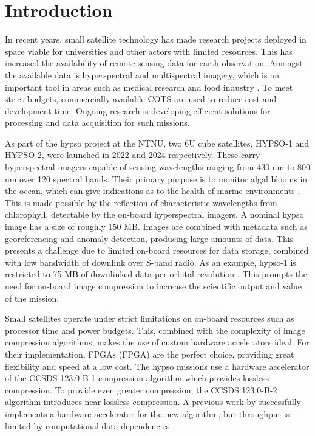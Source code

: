 \chapter{Introduction}

In recent years, small satellite technology has made research projects deployed in space viable for universities and other actors with limited resources. This has increased the availability of remote sensing data for earth observation. Amongst the available data is hyperspectral and multispectral imagery, which is an important tool in areas such as medical research and food industry \cite{ientilucciAtmosphericCompensationHyperspectral2019}. To meet strict budgets, commercially available \acrlong{COTS} are used to reduce cost and development time. Ongoing research is developing efficient solutions for processing and data acquisition for such missions.

As part of the \acrfull{hypso} project at the \acrfull{NTNU}, two 6U cube satellites, HYPSO-1 and HYPSO-2, were launched in 2022 and 2024 respectively. These carry hyperspectral imagers capable of sensing wavelengths ranging from 430 nm to 800 nm over 120 spectral bands. Their primary purpose is to monitor algal blooms in the ocean, which can give indications as to the health of marine environments \cite{grotteOceanColorHyperspectral2022}. This is made possible by the reflection of characteristic wavelengths from chlorophyll, detectable by the on-board hyperspectral imagers. A nominal \acrshort{hypso} image has a size of roughly 150 MB. Images are combined with metadata such as georeferencing and anomaly detection, producing large amounts of data. This presents a challenge due to limited on-board resources for data storage, combined with low bandwidth of downlink over S-band radio. As an example, \acrshort{hypso}-1 is restricted to 75 MB of downlinked data per orbital revolution \cite{grotteOceanColorHyperspectral2022}. This prompts the need for on-board image compression to increase the scientific output and value of the mission.

Small satellites operate under strict limitations on on-board resources such as processor time and power budgets. This, combined with the complexity of image compression algorithms, makes the use of custom hardware accelerators ideal. For their implementation, \acrlong{FPGA}s (\acrshort{FPGA}) are the perfect choice, providing great flexibility and speed at a low cost. The \acrshort{hypso} missions use a hardware accelerator of the CCSDS 123.0-B-1 compression algorithm which provides lossless compression. To provide even greater compression, the CCSDS 123.0-B-2 algorithm introduces near-lossless compression. A previous work by \citeauthor{vorhaugHyperspectralImageCompression2024} successfully implements a hardware accelerator for the new algorithm, but throughput is limited by computational data dependencies.

